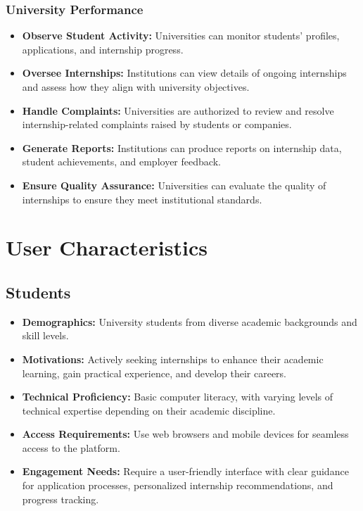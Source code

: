 \subsubsection{University Performance}
\begin{itemize}
    \item \textbf{Observe Student Activity:} Universities can monitor students’ profiles, applications, and internship progress.
    \item \textbf{Oversee Internships:} Institutions can view details of ongoing internships and assess how they align with university objectives.
    \item \textbf{Handle Complaints:} Universities are authorized to review and resolve internship-related complaints raised by students or companies.
    \item \textbf{Generate Reports:} Institutions can produce reports on internship data, student achievements, and employer feedback.
    \item \textbf{Ensure Quality Assurance:} Universities can evaluate the quality of internships to ensure they meet institutional standards.
\end{itemize}

\newpage
\section{User Characteristics}
\label{sec:User_characteristic}

\subsection{Students}
\begin{itemize}
    \item \textbf{Demographics:} University students from diverse academic backgrounds and skill levels.
    \item \textbf{Motivations:} Actively seeking internships to enhance their academic learning, gain practical experience, and develop their careers.
    \item \textbf{Technical Proficiency:} Basic computer literacy, with varying levels of technical expertise depending on their academic discipline.
    \item \textbf{Access Requirements:} Use web browsers and mobile devices for seamless access to the platform.
    \item \textbf{Engagement Needs:} Require a user-friendly interface with clear guidance for application processes, personalized internship recommendations, and progress tracking.
\end{itemize}

